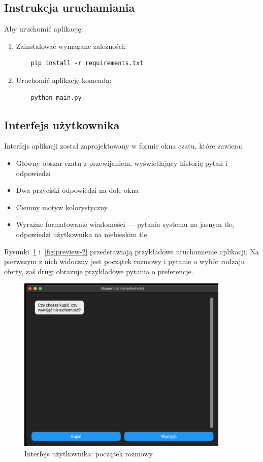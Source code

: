 \subsection{Instrukcja uruchamiania}

Aby uruchomić aplikację:
\begin{enumerate}
    \item Zainstalować wymagane zależności:
    \begin{verbatim}
    pip install -r requirements.txt
    \end{verbatim}
    \item Uruchomić aplikację komendą:
    \begin{verbatim}
    python main.py
    \end{verbatim}
\end{enumerate}

\subsection{Interfejs użytkownika}

Interfejs aplikacji został zaprojektowany w formie okna czatu, które zawiera:
\begin{itemize}
    \item Główny obszar czatu z przewijaniem, wyświetlający historię pytań i odpowiedzi
    \item Dwa przyciski odpowiedzi na dole okna
    \item Ciemny motyw kolorystyczny
    \item Wyraźne formatowanie wiadomości — pytania systemu na jasnym tle, odpowiedzi użytkownika na niebieskim tle
\end{itemize}

\noindent
Rysunki~\ref{fig:preview-1} i~\ref{fig:preview-2} przedstawiają przykładowe uruchomienie aplikacji.
Na pierwszym z nich widoczny jest początek rozmowy i pytanie o wybór rodzaju oferty, zaś drugi obrazuje przykładowe pytania o preferencje.

\begin{figure}[H]
    \centering
    \includegraphics[width=0.9\textwidth]{images/preview-1.png}
    \caption{Interfejs użytkownika: początek rozmowy.}
    \label{fig:preview-1}
\end{figure}

